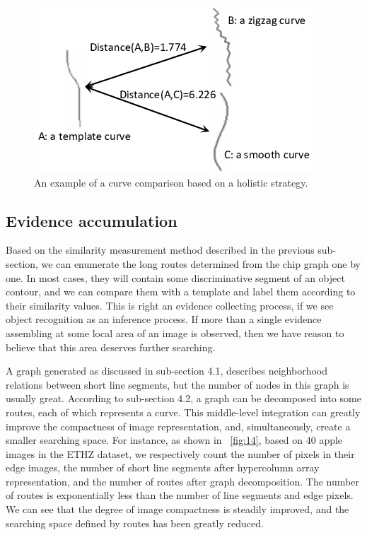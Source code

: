 \documentclass[journal]{IEEEtran}
\begin{document}
\begin{figure}[!t]
\centering
\includegraphics[width=0.6\linewidth]{images/fig13.png}
\caption{An example of a curve comparison based on a holistic strategy.}
\label{fig:13}
\end{figure}

\subsection{Evidence accumulation}

Based on the similarity measurement method described in the previous sub-section, 
we can enumerate the long routes determined from the chip graph one by one. 
In most cases, they will contain some discriminative segment of an object contour, 
and we can compare them with a template and label them according to their similarity values. 
This is right an evidence collecting process, 
if we see object recognition as an inference process. 
If more than a single evidence assembling at some local area of an image is observed, 
then we have reason to believe that this area deserves further searching.

A graph generated as discussed in sub-section 4.1, 
describes neighborhood relations between short line segments, 
but the number of nodes in this graph is usually great. 
According to sub-section 4.2, a graph can be decomposed into some routes, each of which represents a curve. 
This middle-level integration can greatly improve the compactness of image representation, 
and, simultaneously, create a smaller searching space. 
For instance, as shown in \figurename~\ref{fig:14}, based on 40 apple images in the ETHZ dataset, 
we respectively count the number of pixels in their edge images, the number of short line segments after hypercolumn array representation, and the number of routes after graph decomposition. 
The number of routes is exponentially less than the number of line segments and edge pixels.
We can see that the degree of image compactness is steadily improved, 
and the searching space defined by routes has been greatly reduced. 
\end{document}
